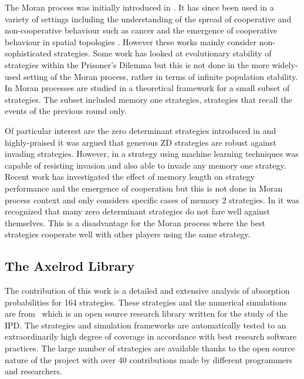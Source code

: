 \documentclass{article}
\begin{document}
The Moran process was initially introduced in \cite{Moran1957}. It has since been
used in a variety of settings including the
understanding of the spread of cooperative and non-cooperative behaviour
such as cancer \cite{West2016} and the emergence of cooperative behaviour
in spatial topologies \cite{Nowak2017}. However these works 
mainly consider non-sophisticated strategies. Some work has looked at
evolutionary stability of strategies within the Prisoner's Dilemma \cite{Li2014}
but this is not done in the more widely-used setting of the Moran process, rather in
terms of infinite population stability. In \cite{Baek2016} Moran processes are
studied in a theoretical framework for a small subset of strategies. 
The subset included memory one strategies, strategies that recall the events 
of the previous round only.

Of particular interest are the zero determinant strategies introduced in \cite{Press2012}
and highly-praised \cite{Stewart26062012} it was argued that 
generous ZD strategies are robust against invading strategies. However,
in \cite{Lee2015} a strategy using machine learning techniques was
capable of resisting invasion and also able to invade any memory one strategy. 
Recent work \cite{Hilbe2017} has investigated the effect of memory length on 
strategy performance and the emergence of cooperation but this is not done in 
Moran process context and only considers specific cases of memory 2 strategies.
In \cite{Adami2013} it was recognized that many zero determinant strategies do
not fare well against themselves. This is a disadvantage for the Moran process
where the best strategies cooperate well with other players using the same strategy.


\subsection{The Axelrod Library}

The contribution of this work is a detailed and extensive analysis of absorption
probabilities for 164 strategies. These strategies and the numerical simulations
are from~\cite{axelrodproject} which is an open source research library written
for the study of the IPD\@. The strategies and simulation frameworks are
automatically tested to an extraordinarily high degree of coverage in accordance
with best research software practices. The large
number of strategies are available thanks to the open source nature of the
project with over 40 contributions made by different programmers and researchers.
\end{document}
